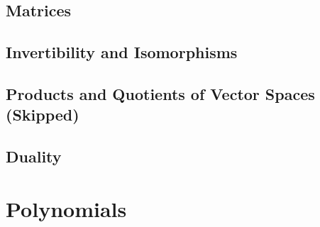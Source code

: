 \documentclass{book}
\begin{document}
\section{Matrices}
\section{Invertibility and Isomorphisms}
\section{Products and Quotients of Vector Spaces (Skipped)}
\section{Duality}





\chapter{Polynomials}
\end{document}
